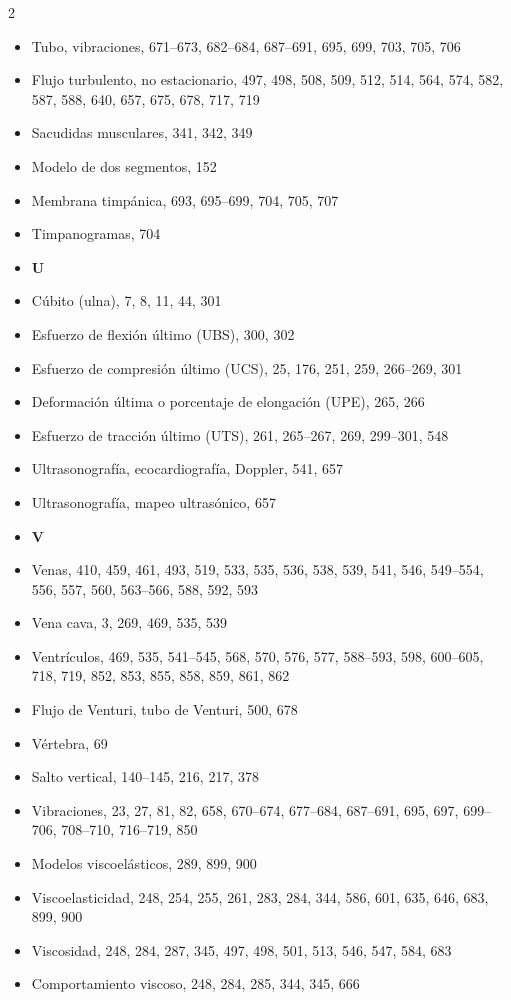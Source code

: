 \documentclass[12pt,a4paper]{book}
\begin{document}
\begin{multicols}{2}
\begin{itemize}[leftmargin=*]
  \item Tubo, vibraciones, 671--673, 682--684, 687--691, 695, 699, 703, 705, 706
  \item Flujo turbulento, no estacionario, 497, 498, 508, 509, 512, 514, 564, 574, 582, 587, 588, 640, 657, 675, 678, 717, 719
  \item Sacudidas musculares, 341, 342, 349
  \item Modelo de dos segmentos, 152
  \item Membrana timpánica, 693, 695--699, 704, 705, 707
  \item Timpanogramas, 704
  \item \textbf{U}
  \item Cúbito (ulna), 7, 8, 11, 44, 301
  \item Esfuerzo de flexión último (UBS), 300, 302
  \item Esfuerzo de compresión último (UCS), 25, 176, 251, 259, 266--269, 301
  \item Deformación última o porcentaje de elongación (UPE), 265, 266
  \item Esfuerzo de tracción último (UTS), 261, 265--267, 269, 299--301, 548
  \item Ultrasonografía, ecocardiografía, Doppler, 541, 657
  \item Ultrasonografía, mapeo ultrasónico, 657
  \item \textbf{V}
  \item Venas, 410, 459, 461, 493, 519, 533, 535, 536, 538, 539, 541, 546, 549--554, 556, 557, 560, 563--566, 588, 592, 593
  \item Vena cava, 3, 269, 469, 535, 539
  \item Ventrículos, 469, 535, 541--545, 568, 570, 576, 577, 588--593, 598, 600--605, 718, 719, 852, 853, 855, 858, 859, 861, 862
  \item Flujo de Venturi, tubo de Venturi, 500, 678
  \item Vértebra, 69
  \item Salto vertical, 140--145, 216, 217, 378
  \item Vibraciones, 23, 27, 81, 82, 658, 670--674, 677--684, 687--691, 695, 697, 699--706, 708--710, 716--719, 850
  \item Modelos viscoelásticos, 289, 899, 900
  \item Viscoelasticidad, 248, 254, 255, 261, 283, 284, 344, 586, 601, 635, 646, 683, 899, 900
  \item Viscosidad, 248, 284, 287, 345, 497, 498, 501, 513, 546, 547, 584, 683
  \item Comportamiento viscoso, 248, 284, 285, 344, 345, 666

\end{itemize}
\end{multicols}
\end{document}
